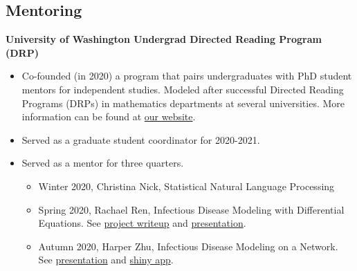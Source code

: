 \documentclass[margin, 10pt]{res} %
\begin{document}
\begin{resume}
{\section{Mentoring}
{\textbf{University of Washington Undergrad Directed Reading Program (DRP)}}
\begin{itemize}
  \item Co-founded (in 2020) a program that pairs undergraduates with PhD student mentors for independent studies. Modeled after successful Directed Reading Programs (DRPs) in mathematics departments at several universities. More information can be found at \href{https://spa-drp.github.io}{our website}. 
  \item Served as a graduate student coordinator for 2020-2021. 
  \item Served as a mentor for three quarters.
  \begin{itemize}
  \item Winter 2020, Christina Nick, Statistical Natural Language Processing
  \item Spring 2020, Rachael Ren, Infectious Disease Modeling with Differential Equations. See \href{https://spa-drp.github.io/writeups/spring2020/rachael.pdf}{project writeup} and \href{https://spa-drp.github.io/writeups/spring2020/rachaelslides.pdf}{presentation}.
  \item Autumn 2020, Harper Zhu, Infectious Disease Modeling on a Network.  See \href{https://spa-drp.github.io/writeups/aut2020/harper-slides.pdf}{presentation} and \href{https://harperzhu.shinyapps.io/DiseaseSimulation/}{shiny app}.
 \end{itemize}
 \end{itemize}



}
\end{resume}
\end{document}
